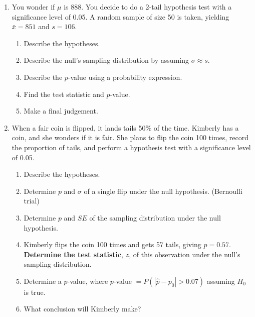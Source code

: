 \documentclass[12pt,letterpaper]{article}
\begin{document}
\begin{enumerate}
\newpage

\item You wonder if $\mu$ is 888. You decide to do a 2-tail hypothesis test with a significance level of 0.05. A random sample of size 50 is taken, yielding $\bar{x} = 851$ and $s=106$. 
\begin{enumerate}
\item Describe the hypotheses.
\vfill
\item Describe the null's sampling distribution by assuming $\sigma \approx s$.
\vfill
\item Describe the $p$-value using a probability expression.
\vfill
\item Find the test statistic and $p$-value.
\vfill
\item Make a final judgement.
\vfill
\end{enumerate}




\newpage

\item When a fair coin is flipped, it lands tails 50\% of the time. Kimberly has a coin, and she wonders if it is fair. She plans to flip the coin 100 times, record the proportion of tails, and perform a hypothesis test with a significance level of 0.05.
\begin{enumerate}
\item Describe the hypotheses.
\vfill
\item Determine $p$ and $\sigma$ of a single flip under the null hypothesis. (Bernoulli trial)
\vfill
\item Determine $p$ and $SE$ of the sampling distribution under the null hypothesis.
\vfill
\item Kimberly flips the coin 100 times and gets 57 tails, giving $\hat{p} = 0.57$. {\bf Determine the test statistic}, $z$, of this observation under the null's sampling distribution.
\vfill
\item Determine a $p$-value, where $p$-value $=P(|\hat{p}-p_0| > 0.07)$ assuming $H_0$ is true.
\vfill
\item What conclusion will Kimberly make?
\vfill
\end{enumerate}
\end{enumerate}
\end{document}
